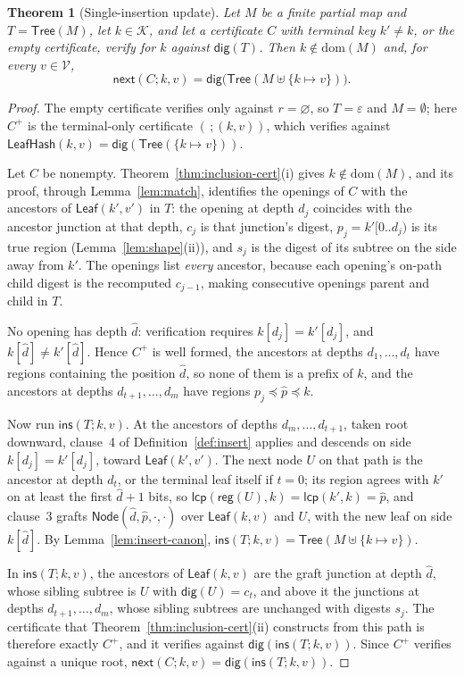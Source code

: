 \documentclass[11pt]{article}
\newtheorem{theorem}{Theorem}
\begin{document}
\begin{theorem}[Single-insertion update]
\label{thm:update}
Let $M$ be a finite partial map and $T = \mathsf{Tree}(M)$, let $k \in \mathcal{K}$, and let a certificate $C$ with terminal key $k' \neq k$, or the empty certificate, verify for $k$ against $\mathsf{dig}(T)$. Then $k \notin \mathrm{dom}(M)$ and, for every $v \in \mathcal{V}$,
\[
  \mathsf{next}(C;k,v) = \mathsf{dig}\bigl(\mathsf{Tree}(M \uplus \{k \mapsto v\})\bigr).
\]
\end{theorem}
\begin{proof}
The empty certificate verifies only against $r = \varnothing$, so $T = \varepsilon$ and $M = \emptyset$; here $C^{+}$ is the terminal-only certificate $(\,;(k,v))$, which verifies against $\mathsf{LeafHash}(k,v) = \mathsf{dig}(\mathsf{Tree}(\{k \mapsto v\}))$.

Let $C$ be nonempty. Theorem~\ref{thm:inclusion-cert}(i) gives $k \notin \mathrm{dom}(M)$, and its proof, through Lemma~\ref{lem:match}, identifies the openings of $C$ with the ancestors of $\mathsf{Leaf}(k',v')$ in $T$: the opening at depth $d_j$ coincides with the ancestor junction at that depth, $c_j$ is that junction's digest, $p_j = k'[0..d_j)$ is its true region (Lemma~\ref{lem:shape}(ii)), and $s_j$ is the digest of its subtree on the side away from $k'$. The openings list \emph{every} ancestor, because each opening's on-path child digest is the recomputed $c_{j-1}$, making consecutive openings parent and child in $T$.

No opening has depth $\hat d$: verification requires $k[d_j] = k'[d_j]$, and $k[\hat d] \neq k'[\hat d]$. Hence $C^{+}$ is well formed, the ancestors at depths $d_1,\ldots,d_t$ have regions containing the position $\hat d$, so none of them is a prefix of $k$, and the ancestors at depths $d_{t+1},\ldots,d_m$ have regions $p_j \preceq \hat p \preceq k$.

Now run $\mathsf{ins}(T;k,v)$. At the ancestors of depths $d_m,\ldots,d_{t+1}$, taken root downward, clause~4 of Definition~\ref{def:insert} applies and descends on side $k[d_j] = k'[d_j]$, toward $\mathsf{Leaf}(k',v')$. The next node $U$ on that path is the ancestor at depth $d_t$, or the terminal leaf itself if $t = 0$; its region agrees with $k'$ on at least the first $\hat d + 1$ bits, so $\mathsf{lcp}(\mathsf{reg}(U),k) = \mathsf{lcp}(k',k) = \hat p$, and clause~3 grafts $\mathsf{Node}(\hat d,\hat p,\cdot,\cdot)$ over $\mathsf{Leaf}(k,v)$ and $U$, with the new leaf on side $k[\hat d]$. By Lemma~\ref{lem:insert-canon}, $\mathsf{ins}(T;k,v) = \mathsf{Tree}(M \uplus \{k \mapsto v\})$.

In $\mathsf{ins}(T;k,v)$, the ancestors of $\mathsf{Leaf}(k,v)$ are the graft junction at depth $\hat d$, whose sibling subtree is $U$ with $\mathsf{dig}(U) = c_t$, and above it the junctions at depths $d_{t+1},\ldots,d_m$, whose sibling subtrees are unchanged with digests $s_j$. The certificate that Theorem~\ref{thm:inclusion-cert}(ii) constructs from this path is therefore exactly $C^{+}$, and it verifies against $\mathsf{dig}(\mathsf{ins}(T;k,v))$. Since $C^{+}$ verifies against a unique root, $\mathsf{next}(C;k,v) = \mathsf{dig}(\mathsf{ins}(T;k,v))$.
\end{proof}
\end{document}
